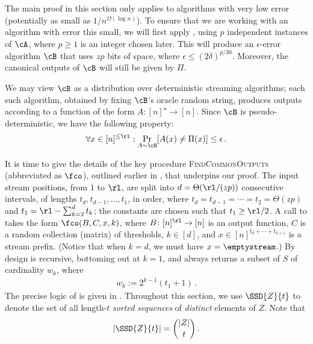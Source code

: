 \begin{itemize}
\begin{itemize}
The main proof in this section only applies to algorithms with very low error
(potentially as small as $1/n^{\Omega(\log n)}$). To ensure that we are
working with an algorithm with error this small, we will first apply
, using $p$ independent instances of $\cA$,
where $p \ge 1$ is an integer chosen later. This will produce an $\epsilon$-error
algorithm $\cB$ that uses $z p$ bits of space, where $\epsilon \le
(2\delta)^{p/30}$. Moreover, the canonical outputs of $\cB$ will still be
given by $\Pi$.

We may view $\cB$ as a distribution over deterministic streaming algorithms;
each such algorithm, obtained by fixing $\cB$'s oracle random string, produces
outputs according to a function of the form $A \colon [n]^\star \to [n]$.
Since $\cB$ is pseudo-deterministic, we have the following property:
\begin{align}
  \forall x \in [n]^{\le \rl}: \Pr_{A \sim \cB} [A(x) \ne \Pi(x)] \le \epsilon \,. 
  \label{eq:pd-fn-prop}
\end{align}

It is time to give the details of the key procedure \textsc{FindCommonOutputs}
(abbreviated as $\fco$), outlined earlier in ,
that underpins our proof.  The input stream positions, from $1$ to $\rl$, are
split into $d = \Theta(\rl / (zp))$ consecutive intervals, of lengths $t_d,
t_{d-1}, \ldots, t_1$, in order, where $t_d = t_{d-1} = \cdots = t_2 =
\Theta(zp)$ and $t_1 = \rl - \sum_{k=2}^{d} t_k$; the constants are chosen
such that $t_1 \ge \rl/2$. A call to \fco takes the form $\fco(B, C, x,
k)$, where $B \colon [n]^\rl \to [n]$ is an output function, $C$ is a random
collection (matrix) of thresholds, $k \in [d]$, and $x \in [n]^{t_d + \cdots +
t_{k+1}}$ is a stream prefix. (Notice that when $k = d$, we must have $x =
\emptystream$.) By design \fco is recursive, bottoming out at $k = 1$, and
always returns a subset of $S$ of cardinality $w_k$, where
\begin{align}
  w_k := 2^{k-1} (t_1 + 1) \,. \label{eq:wk-def}
\end{align}
The precise logic of \fco is given in . Throughout
this section, we use $\SSD{Z}{t}$ to denote the set of all length-$t$ {\em
sorted sequences} of {\em distinct} elements of $Z$. Note that
\[
  |\SSD{Z}{t}| = \binom{|Z|}{t} \,.
\]

\end{itemize}
\end{itemize}
